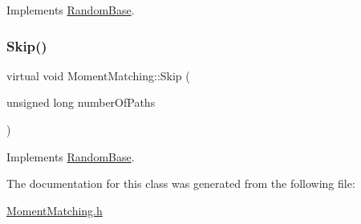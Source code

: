 Implements \hyperlink{classRandomBase_ae93f26c38d1675ef07cb1fd29b894b26}{Random\+Base}.

\hypertarget{classMomentMatching_a14d56de714eb1a9025f0ff1ea8956931}{}\label{classMomentMatching_a14d56de714eb1a9025f0ff1ea8956931} 
\subsubsection{\texorpdfstring{Skip()}{Skip()}}
{\footnotesize\ttfamily virtual void Moment\+Matching\+::\+Skip (\begin{DoxyParamCaption}\item[{unsigned long}]{number\+Of\+Paths }\end{DoxyParamCaption})\hspace{0.3cm}{\ttfamily [virtual]}}



Implements \hyperlink{classRandomBase_a0531f44e3e2a71d14ef1490aa5d90b77}{Random\+Base}.



The documentation for this class was generated from the following file\+:\begin{DoxyCompactItemize}
\item 
\hyperlink{MomentMatching_8h}{Moment\+Matching.\+h}\end{DoxyCompactItemize}
